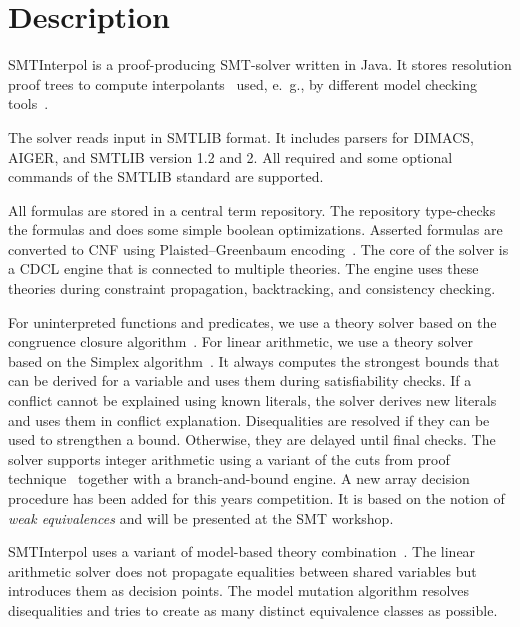 \documentclass{article}
\title{\SI\\{\large Version \version}}
\author{J\"urgen Christ, Jochen Hoenicke\\
  University of Freiburg\\
  \texttt{\{christj,hoenicke\}@informatik.uni-freiburg.de}}
\newcommand\SI{SMTInterpol\xspace}
\begin{document}
\maketitle
\section*{Description}
\SI is a proof-producing SMT-solver written in Java.  It stores resolution
proof trees to compute interpolants~\cite{mcmillan05itp} used, e.~g., by
different model checking tools~\cite{HHP09,HHP10,DBLP:conf/vmcai/ErmisHP12}.

The solver reads input in SMTLIB format.  It includes parsers for DIMACS,
AIGER, and SMTLIB version 1.2 and 2.  All required and some optional commands
of the SMTLIB standard are supported.

All formulas are stored in a central term repository.  The repository
type-checks the formulas and does some simple boolean optimizations.  Asserted
formulas are converted to CNF using Plaisted--Greenbaum
encoding~\cite{DBLP:journals/jsc/PlaistedG86}.  The core of the solver is a
CDCL engine that is connected to multiple theories.  The engine uses these
theories during constraint propagation, backtracking, and consistency
checking.

For uninterpreted functions and predicates, we use a theory solver based on
the congruence closure algorithm~\cite{DBLP:conf/rta/NieuwenhuisO05}.  For
linear arithmetic, we use a theory solver based on the Simplex
algorithm~\cite{DBLP:conf/cav/DutertreM06}.  It always computes the strongest
bounds that can be derived for a variable and uses them during satisfiability
checks.  If a conflict cannot be explained using known literals, the solver
derives new literals and uses them in conflict explanation.  Disequalities are
resolved if they can be used to strengthen a bound.  Otherwise, they are
delayed until final checks.  The solver supports integer arithmetic using a
variant of the cuts from proof technique~\cite{DBLP:conf/cav/DilligDA09}
together with a branch-and-bound engine.  A new array decision procedure has
been added for this years competition.  It is based on the notion of
\emph{weak equivalences} and will be presented at the SMT workshop.

\SI uses a variant of model-based theory
combination~\cite{DBLP:journals/entcs/MouraB08}.  The linear arithmetic solver
does not propagate equalities between shared variables but introduces them as
decision points.  The model mutation algorithm resolves disequalities
and tries to create as many distinct equivalence classes as possible.
\end{document}
